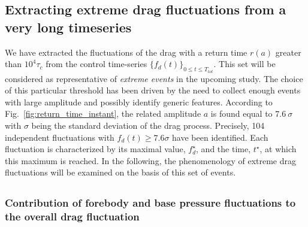\documentclass{jfm}
\newcommand{\EL}[1]{{\color{myred}{#1}}}
\begin{document}



\subsection{Extracting extreme drag fluctuations from a very long timeseries}
\label{sec:extreme_extraction}

% 
We have extracted the fluctuations of the drag with a return time $r(a)$ greater than  $10^4\tau_c$ from the control time-series $\{f_d(t)\}_{0 \leq t \leq T_{tot}}$.
This set will be considered as representative of \emph{extreme events} in the upcoming study.
The choice of this particular threshold has been driven by the need to collect enough events with large amplitude and possibly identify generic features.
% 
According to Fig.~\ref{fig:return_time_instant}, the related amplitude $a$ is found equal to $7.6~\sigma$ with $\sigma$ being the standard deviation of the drag process.
Precisely, 104 independent fluctuations with $f_d(t) \geq 7.6\sigma$ have been identified. Each fluctuation is characterized by its maximal value, $f_d^{\star}$, and the time, $t^{\star}$, at which this maximum is reached.
% 
In the following, the phenomenology of extreme drag fluctuations will be examined on the basis of this set of events.

\subsection{\EL{Extreme fluctuations of the instantaneous drag}}
\label{sec:instantaneous_drag}

\subsubsection{Contribution of forebody and base pressure fluctuations to the overall drag fluctuation}
\label{sec:forebody_and_base_contribution}
\end{document}
